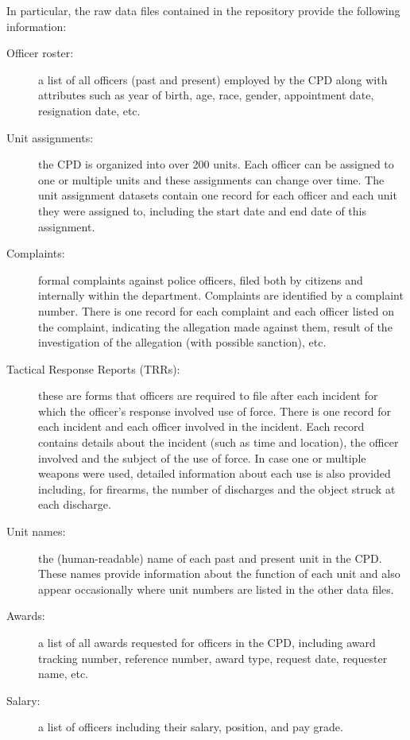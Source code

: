 In particular, the raw data files contained in the repository
provide the following information:
\begin{description}
	\item[Officer roster:] a list of all officers (past and present) employed
		by the CPD along with attributes such as year of birth, age, race,
		gender, appointment date, resignation date, etc.
	\item[Unit assignments:] the CPD is organized into over 200 units.
		Each officer can be assigned to one or multiple units and these
		assignments can change over time. The unit assignment datasets contain
		one record for each officer and each unit they were assigned to, including
		the start date and end date of this assignment.
	\item[Complaints:] formal complaints against police officers, filed both by
		citizens and internally within the department. Complaints are
		identified by a complaint number. There is one record for each
		complaint and each officer listed on the complaint, indicating the
		allegation made against them, result of the investigation of the
		allegation (with possible sanction), etc.
	\item[Tactical Response Reports (TRRs):] these are forms that officers are
		required to file after each incident for which the officer's response
		involved use of force. There is one record for each incident and each
		officer involved in the incident. Each record contains details about
		the incident (such as time and location), the officer involved and the
		subject of the use of force. In case one or multiple weapons were used,
		detailed information about each use is also provided including, for
		firearms, the number of discharges and the object struck at each
		discharge.
	\item[Unit names:] the (human-readable) name of each past and present
		unit in the CPD. These names provide information about the function of
		each unit and also appear occasionally where unit numbers are listed in
		the other data files.
	\item[Awards:] a list of all awards requested for officers in the CPD,
		including award tracking number, reference number, award type, request
		date, requester name, etc.
	\item[Salary:] a list of officers including their salary, position, and pay grade.
\end{description}


